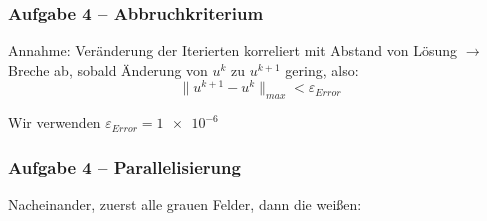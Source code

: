 \documentclass[german,notes,18pt]{beamer}
\begin{document}
	\begin{frame}
		\frametitle{Aufgabe 4 -- Abbruchkriterium}
		
		Annahme: Veränderung der Iterierten korreliert mit Abstand von Lösung
		$\rightarrow$ Breche ab, sobald Änderung von $u^k$ zu $u^{k+1}$ gering, also:
		\begin{equation*}
			\|u^{k+1}-u^k\|_{max}<\varepsilon_{Error}
		\end{equation*}
		
		Wir verwenden $\varepsilon_{Error}=\num{1e-6}$
	\end{frame}

	\begin{frame}
		\frametitle{Aufgabe 4 -- Parallelisierung}
		
		Nacheinander, zuerst alle grauen Felder, dann die weißen:
		

\end{frame}
\end{document}
